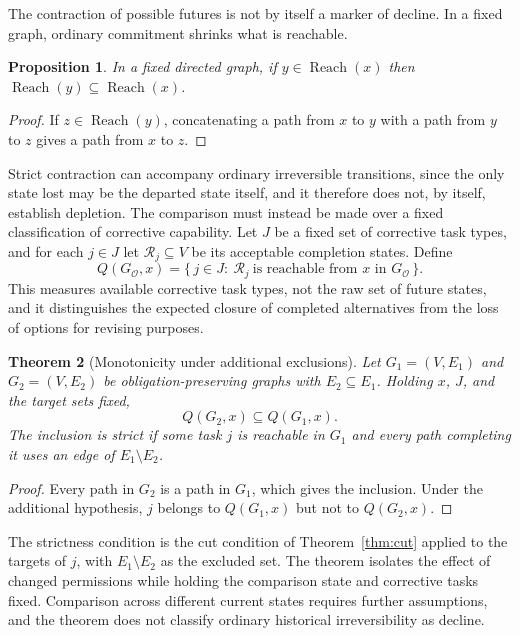 \documentclass[11pt]{article}
\newtheorem{theorem}{Theorem}
\newtheorem{proposition}[theorem]{Proposition}
\theoremstyle{definition}
\theoremstyle{remark}
\newcommand{\Reach}{\operatorname{Reach}}
\begin{document}
The contraction of possible futures is not by itself a marker of decline. In a fixed graph, ordinary commitment shrinks what is reachable.

\begin{proposition}\label{prop:reachmono}
In a fixed directed graph, if $y\in\Reach(x)$ then $\Reach(y)\subseteq\Reach(x)$.
\end{proposition}
\begin{proof}
If $z\in\Reach(y)$, concatenating a path from $x$ to $y$ with a path from $y$ to $z$ gives a path from $x$ to $z$. \qedhere
\end{proof}

Strict contraction can accompany ordinary irreversible transitions, since the only state lost may be the departed state itself, and it therefore does not, by itself, establish depletion. The comparison must instead be made over a fixed classification of corrective capability. Let $J$ be a fixed set of corrective task types, and for each $j\in J$ let $\mathcal R_j\subseteq V$ be its acceptable completion states. Define
\[
Q(G_{\mathcal O},x)=\{\,j\in J:\ \mathcal R_j\ \text{is reachable from }x\text{ in }G_{\mathcal O}\,\}.
\]
This measures available corrective task types, not the raw set of future states, and it distinguishes the expected closure of completed alternatives from the loss of options for revising purposes.

\begin{theorem}[Monotonicity under additional exclusions]\label{thm:monoex}
Let $G_1=(V,E_1)$ and $G_2=(V,E_2)$ be obligation-preserving graphs with $E_2\subseteq E_1$. Holding $x$, $J$, and the target sets fixed,
\[
Q(G_2,x)\subseteq Q(G_1,x).
\]
The inclusion is strict if some task $j$ is reachable in $G_1$ and every path completing it uses an edge of $E_1\setminus E_2$.
\end{theorem}
\begin{proof}
Every path in $G_2$ is a path in $G_1$, which gives the inclusion. Under the additional hypothesis, $j$ belongs to $Q(G_1,x)$ but not to $Q(G_2,x)$. \qedhere
\end{proof}

The strictness condition is the cut condition of Theorem~\ref{thm:cut} applied to the targets of $j$, with $E_1\setminus E_2$ as the excluded set. The theorem isolates the effect of changed permissions while holding the comparison state and corrective tasks fixed. Comparison across different current states requires further assumptions, and the theorem does not classify ordinary historical irreversibility as decline.
\end{document}
